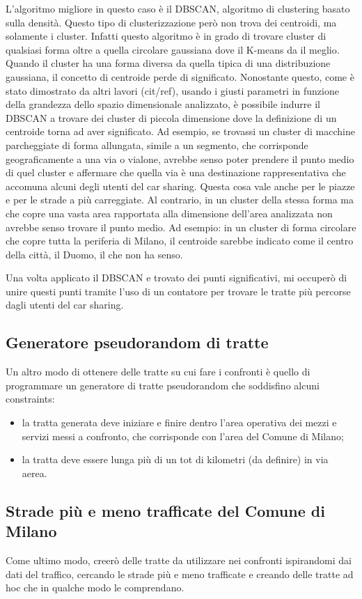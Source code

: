 \documentclass[a4paper]{report}
\begin{document}
	L'algoritmo migliore in questo caso è il DBSCAN, algoritmo di clustering basato sulla densità. Questo tipo di clusterizzazione però non trova dei centroidi, ma solamente i cluster. Infatti questo algoritmo è in grado di trovare cluster di qualsiasi forma oltre a quella circolare gaussiana dove il K-means da il meglio. Quando il cluster ha una forma diversa da quella tipica di una distribuzione gaussiana, il concetto di centroide perde di significato. Nonostante questo, come è stato dimostrato da altri lavori (cit/ref), usando i giusti parametri in funzione della grandezza dello spazio dimensionale analizzato, è possibile indurre il DBSCAN a trovare dei cluster di piccola dimensione dove la definizione di un centroide torna ad aver significato. Ad esempio, se trovassi un cluster di macchine parcheggiate di forma allungata, simile a un segmento, che corrisponde geograficamente a una via o vialone, avrebbe senso poter prendere il punto medio di quel cluster e affermare che quella via è una destinazione rappresentativa che accomuna alcuni degli utenti del car sharing. Questa cosa vale anche per le piazze e per le strade a più carreggiate. Al contrario, in un cluster della stessa forma ma che copre una vasta area rapportata alla dimensione dell'area analizzata non avrebbe senso trovare il punto medio. Ad esempio: in un cluster di forma circolare che copre tutta la periferia di Milano, il centroide sarebbe indicato come il centro della città, il Duomo, il che non ha senso.
	
	Una volta applicato il DBSCAN e trovato dei punti significativi, mi occuperò di unire questi punti tramite l'uso di un contatore per trovare le tratte più percorse dagli utenti del car sharing.
	
	\subsection{Generatore pseudorandom di tratte}
	Un altro modo di ottenere delle tratte su cui fare i confronti è quello di programmare un generatore di tratte pseudorandom che soddisfino alcuni constraints: 
	\begin{itemize}
		\item la tratta generata deve iniziare e finire dentro l'area operativa dei mezzi e servizi messi a confronto, che corrisponde con l'area del Comune di Milano;
		\item la tratta deve essere lunga più di un tot di kilometri (da definire) in via aerea.
	\end{itemize}
	
	\subsection{Strade più e meno trafficate del Comune di Milano}
	Come ultimo modo, creerò delle tratte da utilizzare nei confronti ispirandomi dai dati del traffico, cercando le strade più e meno trafficate e creando delle tratte ad hoc che in qualche modo le comprendano.	

	
	
\end{document}
